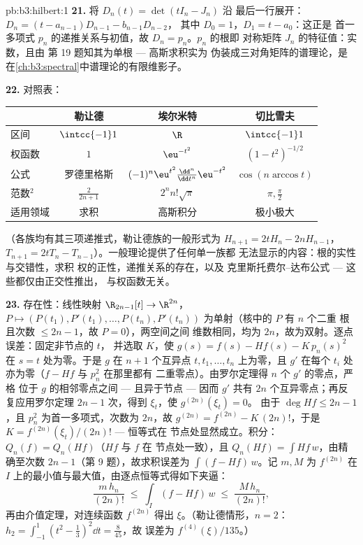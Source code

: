 \begin{solution}{pb:b3:hilbert:1}
\textbf{21.} 将 $D_n(t) = \det(tI_n - J_n)$ 沿
最后一行展开：$D_n = (t - a_{n-1})D_{n-1} - b_{n-1}D_{n-2}$，
其中 $D_0 = 1$，$D_1 = t - a_0$：这正是
首一多项式 $p_n$ 的递推关系与初值，故 $D_n = p_n$。$p_n$ 的根即
对称矩阵 $J_n$ 的特征值：实数，且由
第 19 题知其为单根 --- 高斯求积实为
伪装成三对角矩阵的谱理论，是
在\cref{ch:b3:spectral}中谱理论的有限维影子。

\textbf{22.} 对照表：
\begin{center}
\begin{tabular}{l|c|c|c}
 & 勒让德 & 埃尔米特 & 切比雪夫\\
\hline
区间 & $\intcc{-1}1$ & $\R$ & $\intcc{-1}1$\\
权函数 & $1$ & $\eu^{-t^2}$ & $(1-t^2)^{-1/2}$\\
公式 & 罗德里格斯 & $(-1)^n\eu^{t^2}
\frac{\dd^n}{\dd t^n}\eu^{-t^2}$ & $\cos(n\arccos t)$\\
范数$^2$ & $\frac2{2n+1}$ & $2^nn!\sqrt\pi$ & $\pi,
\frac\pi2$\\
适用领域 & 求积 & 高斯积分 & 极小极大\\
\end{tabular}
\end{center}
（各族均有其三项递推式，勒让德族的一般形式为
$H_{n+1} = 2tH_n - 2nH_{n-1}$，$T_{n+1} = 2tT_n -
T_{n-1}$）。一般理论提供了任何单一族都
无法显示的内容：根的实性与交错性，求积
权的正性，递推关系的存在，以及
克里斯托费尔--达布公式 --- 这些都仅由正交性推出，
与权函数无关。

\textbf{23.} 存在性：线性映射 $\R_{2n-1}[t] \to
\R^{2n}$，$P \mapsto (P(t_1), P'(t_1), \dots, P(t_n),
P'(t_n))$ 为单射（核中的 $P$ 有 $n$ 个二重
根且次数 $\leq 2n - 1$，故 $P = 0$），两空间之间
维数相同，均为 $2n$，故为双射。逐点误差：固定非节点的 $t$，
并选取 $K$，使 $g(s) = f(s) - Hf(s) -
K\,p_n(s)^2$ 在 $s = t$ 处为零。于是 $g$ 在
$n + 1$ 个互异点 $t, t_1, \dots, t_n$ 上为零，且 $g'$
在每个 $t_i$ 处亦为零（$f - Hf$ 与 $p_n^2$ 在那里都有
二重零点）。由罗尔定理得 $n$ 个 $g'$ 的零点，严格
位于 $g$ 的相邻零点之间 --- 且异于节点
--- 因而 $g'$ 共有 $2n$ 个互异零点；再反复应用罗尔定理 $2n - 1$
次，得到 $\xi_t$，使 $g^{(2n)}(\xi_t) = 0$。
由于 $\deg Hf \leq 2n - 1$，且 $p_n^2$ 为首一多项式，次数为
$2n$，故 $g^{(2n)} = f^{(2n)} - K\,(2n)!$，于是 $K =
f^{(2n)}(\xi_t)/(2n)!$ --- 恒等式在
节点处显然成立。积分：$Q_n(f) = Q_n(Hf)$（$Hf$ 与 $f$ 在
节点处一致），且 $Q_n(Hf) = \int Hf\,w$，由精确至次数
$2n - 1$（第 9 题），故求积误差为
$\int(f - Hf)\,w$。记 $m, M$ 为 $f^{(2n)}$ 在
$I$ 上的最小值与最大值，由逐点恒等式得如下夹逼：
\[
\frac{m\,h_n}{(2n)!} \;\leq\; \int_I(f - Hf)\,w
\;\leq\; \frac{M\,h_n}{(2n)!} ,
\]
再由介值定理，对连续函数
$f^{(2n)}$ 得出 $\xi$。（勒让德情形，$n = 2$：$h_2
= \int_{-1}^1(t^2 - \frac13)^2\dd t = \frac8{45}$，故
误差为 $f^{(4)}(\xi)/135$。）


\end{solution}
